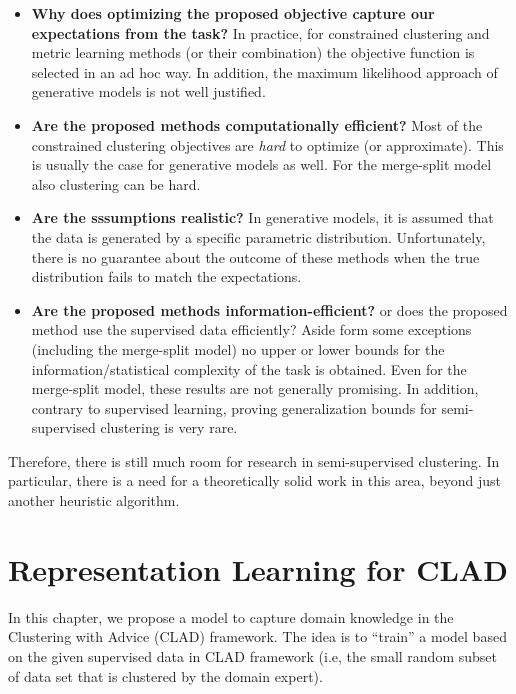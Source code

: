 \documentclass[letterpaper,12pt,titlepage,oneside,final]{book}
\begin{document}
\begin{itemize}
\item {\bf Why does optimizing the proposed objective capture our expectations from the task?} In practice, for constrained clustering and metric learning methods (or their combination) the objective function is selected in an ad hoc way. In addition, the maximum likelihood approach of generative models is not well justified.

\item {\bf Are the proposed methods computationally efficient?} Most of the constrained clustering objectives are \emph{hard} to optimize (or approximate). This is usually the case for generative models as well. For the merge-split model also clustering can be hard.


\item {\bf Are the sssumptions realistic?} In generative models, it is assumed that the data is generated by a specific parametric distribution. Unfortunately, there is no guarantee about the outcome of these methods when the true distribution fails to match the expectations.

\item {\bf Are the proposed methods information-efficient?} or does the proposed method use the supervised data efficiently? Aside form some exceptions (including the merge-split model) no upper or lower bounds for the information/statistical complexity of the task is obtained. Even for the merge-split model, these results are not generally promising. In addition, contrary to supervised learning, proving generalization bounds for semi-supervised clustering is very rare.  


\end{itemize}

Therefore, there is still much room for research in semi-supervised clustering. In particular, there is a need for a theoretically solid work in this area, beyond just another heuristic algorithm.  




\chapter{Representation Learning for CLAD}
\label{METHOD}

In this chapter, we propose a model to capture domain knowledge in the Clustering with Advice (CLAD) framework. The idea is to ``train'' a model based on the given supervised data in CLAD framework (i.e, the small random subset of data set that is clustered by the domain expert).
\end{document}
